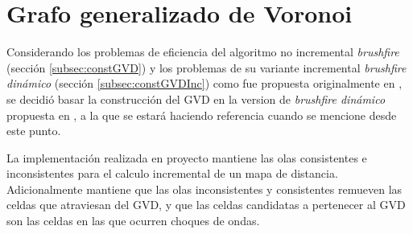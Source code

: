 






\section{Grafo generalizado de Voronoi}\label{sec:MiConstGVD}

Considerando los problemas de eficiencia del algoritmo no incremental \emph{brushfire} (sección
\ref{subsec:constGVD}) y los problemas de su variante incremental
\emph{brushfire dinámico} (sección \ref{subsec:constGVDInc}) como fue propuesta
originalmente en \cite{kalra2009incremental}, se decidió basar la construcción
del GVD en la version de \emph{brushfire dinámico} propuesta en \cite{Lau2013},
a la que se estará haciendo referencia cuando se mencione  desde este punto.


La implementación realizada en proyecto mantiene las olas consistentes e
inconsistentes para el calculo incremental de un mapa de distancia.
Adicionalmente mantiene que las olas inconsistentes y consistentes remueven las
celdas que atraviesan del GVD, y que las celdas candidatas a pertenecer al GVD
son las celdas en las que ocurren choques de ondas.


